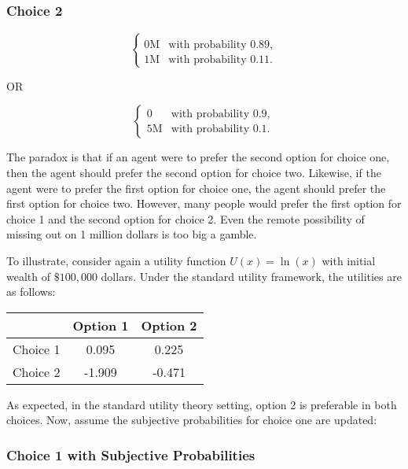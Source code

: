\documentclass{article}
\begin{document}
\subsubsection{Choice 2}

\begin{equation*}
\left\{
\begin{array}{rl}
\\0\text{M} & \text{with probability } 0.89,
\\1\text{M} & \text{with probability } 0.11.
\end{array} \right.
\end{equation*}

OR

\begin{equation*}
\left\{
\begin{array}{rl}
0 & \text{with probability } 0.9,
\\5\text{M} & \text{with probability } 0.1.
\end{array} \right.
\end{equation*}

The paradox is that if an agent were to prefer the second option for choice one, then the agent should prefer the second option for choice two.  Likewise, if the agent were to prefer the first option for choice one, the agent should prefer the first option for choice two.  However, many people would prefer the first option for choice 1 and the second option for choice 2.  Even the remote possibility of missing out on 1 million dollars is too big a gamble.  

To illustrate, consider again a utility function \(U(x)=\ln(x)\) with initial wealth of \(\$100,000\) dollars.  Under the standard utility framework, the utilities are as follows:
\begin{center} 
\begin{tabular}{c|c c}
	& Option 1 & Option 2 \\
	\hline
	Choice 1  & 0.095 & 0.225 \\
	Choice 2  &  -1.909 & -0.471 
\end{tabular}
\end{center}
As expected, in the standard utility theory setting, option 2 is preferable in both choices.  Now, assume the subjective probabilities for choice one are updated:

\subsubsection{Choice 1 with Subjective Probabilities}
\end{document}
